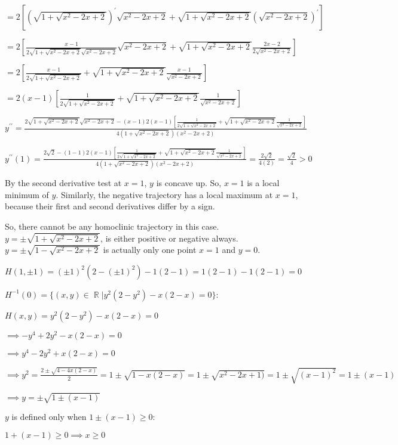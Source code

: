 \documentclass{article}
\begin{document}
$= 2\left[  \left(\sqrt{1
      + \sqrt{x^2-2x+2}}\right)^\prime \sqrt{x^2-2x+2} +\sqrt{1
    + \sqrt{x^2-2x+2}} \left(\sqrt{x^2-2x+2}\right)^\prime\right]$

$= 2\left[\frac{x-1}{2\sqrt{1
    + \sqrt{x^2-2x+2}}\sqrt{x^2-2x+2}}
 \sqrt{x^2-2x+2} +\sqrt{1
   + \sqrt{x^2-2x+2}} \frac{2x-2}{2\sqrt{x^2-2x+2}}\right]$

$= 2\left[\frac{x-1}{2\sqrt{1
    + \sqrt{x^2-2x+2}}} +\sqrt{1
   + \sqrt{x^2-2x+2}} \frac{x-1}{\sqrt{x^2-2x+2}}\right]$


$= 2(x-1)\left[\frac{1}{2\sqrt{1
    + \sqrt{x^2-2x+2}}} +\sqrt{1
  + \sqrt{x^2-2x+2}} \frac{1}{\sqrt{x^2-2x+2}}\right]$

$y^{\prime\prime} = \frac{2\sqrt{1
    + \sqrt{x^2-2x+2}}\sqrt{x^2-2x+2} -(x-1)2(x-1)\left[\frac{1}{2\sqrt{1
    + \sqrt{x^2-2x+2}}} +\sqrt{1
  + \sqrt{x^2-2x+2}} \frac{1}{\sqrt{x^2-2x+2}}\right]}{4(1
+ \sqrt{x^2-2x+2})(x^2-2x+2)}$


$y^{\prime\prime}(1) = \frac{2\sqrt{2} -(1-1)2(x-1)\left[\frac{1}{2\sqrt{1
    + \sqrt{x^2-2x+2}}} +\sqrt{1
  + \sqrt{x^2-2x+2}} \frac{1}{\sqrt{x^2-2x+2}}\right]}{4(1
+ \sqrt{x^2-2x+2})(x^2-2x+2)} = \frac{2\sqrt{2}}{4(2)} =
\frac{\sqrt{2}}{4} > 0$

By the second derivative test at $x = 1$, $y$ is concave up. So, $x =
1$ is a local minimum of $y$. Similarly, the negative
trajectory has a local maximum at $x = 1$, because their first and
second derivatives differ by a sign.

So, there cannot be any homoclinic trajectory in this case. $y = \pm \sqrt{1
  + \sqrt{x^2-2x + 2}}$, is either positive or negative always. $y = \pm \sqrt{1
  - \sqrt{x^2-2x + 2}}$ is actually only one point $x=1$ and $y =0$.

$H(1,\pm 1)= (\pm 1)^2(2-(\pm 1)^2) -1(2-1) = 1(2-1)-1(2-1) = 0$

$H^{-1}(0) = \{(x,y) \in \BbbR | y^2(2-y^2) -x(2-x) = 0\}$:

$H(x,y) = y^2(2-y^2) -x(2-x) = 0 $

$\implies -y^4+2y^2 -x(2-x) = 0$

$\implies y^4-2y^2 +x(2-x) = 0$

$\implies y^2 = \frac{2 \pm \sqrt{4-4x(2-x)}}{2} = 1 \pm
\sqrt{1-x(2-x)} = 1 \pm
\sqrt{x^2-2x +1)} = 1 \pm \sqrt{(x-1)^2} = 1 \pm (x-1) $

$\implies y = \pm \sqrt{1 \pm (x-1)}$

$y$ is defined only when  $1 \pm (x-1) \geq 0$:

$1 + (x-1) \geq 0 \implies x \geq 0$
\end{document}
